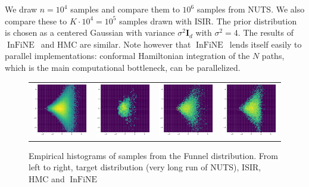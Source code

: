 \documentclass{article}
\def\IFIS{\ensuremath{\operatorname{InFiNE}}}
\def\InFiNE{{\small \IFIS}}
\newcommand{\1}{\mathds{1}}
\begin{document}
We draw $n = 10^4$ samples and compare them to  $10^6$ samples from  NUTS.
We also compare these to $K\cdot 10^4 = 10^5$ samples drawn with ISIR. The prior distribution is chosen as a centered Gaussian with variance $\sigma^2\mathbf{I}_d$ with $\sigma^2=4$. The results of \IFIS\ and HMC are similar. Note however that \IFIS\ lends itself easily to  parallel implementations: conformal Hamiltonian integration of the $N$ paths, which is the main computational bottleneck, can be parallelized.\\ 
\begin{figure}[!ht]
\caption{Empirical histograms of samples from the Funnel distribution.
From left to right, target distribution (very long run of NUTS), ISIR, HMC and \InFiNE}
    \label{fig:funnel_samples}
    \centering
    \begin{tabular}{cccc}
       \includegraphics[width=.22\linewidth]{histogram_true_funnel1.pdf}
         &  
          \includegraphics[width=.22\linewidth]{histogram_isir_funnel1.pdf}
          &
           \includegraphics[width=.22\linewidth]{histogram_nuts_funnel1.pdf}
           &
            \includegraphics[width=.22\linewidth]{histogram_infine_funnel2.pdf}
    \end{tabular}
\end{figure}
\end{document}
